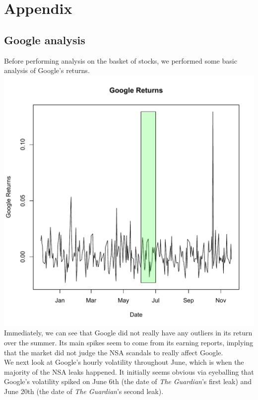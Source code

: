 \documentclass[11pt]{amsart}
\begin{document}
\newpage
\section{Appendix}

\subsection{Google analysis}
Before performing analysis on the basket of stocks, we performed some basic analysis of Google's returns. \\

\includegraphics[scale=0.4]{goog_returns_11_25.pdf} \\

Immediately, we can see that Google did not really have any outliers in its return over the summer. Its main spikes seem to come from its earning reports, implying that the market did not judge the NSA scandals to really affect Google. \\

We next look at Google's hourly volatility throughout June, which is when the majority of the NSA leaks happened. It initially seems obvious via eyeballing that Google's volatility spiked on June 6th (the date of \textit{The Guardian}'s first leak) and June 20th (the date of \textit{The Guardian}'s second leak). \\
\end{document}
